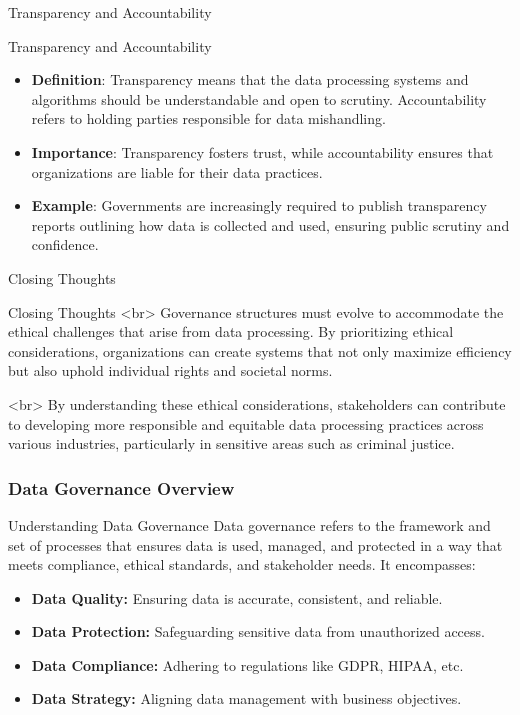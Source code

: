 \documentclass[aspectratio=169]{beamer}
\begin{document}
\begin{frame}[fragile]{Transparency and Accountability}
  \begin{block}{Transparency and Accountability}
    \begin{itemize}
      \item \textbf{Definition}: Transparency means that the data processing systems and algorithms should be understandable and open to scrutiny. Accountability refers to holding parties responsible for data mishandling.
      \item \textbf{Importance}: Transparency fosters trust, while accountability ensures that organizations are liable for their data practices.
      \item \textbf{Example}: Governments are increasingly required to publish transparency reports outlining how data is collected and used, ensuring public scrutiny and confidence.
    \end{itemize}
  \end{block}
\end{frame}

\begin{frame}[fragile]{Closing Thoughts}
  \begin{block}{Closing Thoughts}
    <br>
    Governance structures must evolve to accommodate the ethical challenges that arise from data processing. By prioritizing ethical considerations, organizations can create systems that not only maximize efficiency but also uphold individual rights and societal norms.
    
    <br>
    By understanding these ethical considerations, stakeholders can contribute to developing more responsible and equitable data processing practices across various industries, particularly in sensitive areas such as criminal justice.
  \end{block}
\end{frame}

\begin{frame}[fragile]
    \frametitle{Data Governance Overview}
    \begin{block}{Understanding Data Governance}
        Data governance refers to the framework and set of processes that ensures data is used, managed, and protected in a way that meets compliance, ethical standards, and stakeholder needs. It encompasses:
    \end{block}
    \begin{itemize}
        \item \textbf{Data Quality:} Ensuring data is accurate, consistent, and reliable.
        \item \textbf{Data Protection:} Safeguarding sensitive data from unauthorized access.
        \item \textbf{Data Compliance:} Adhering to regulations like GDPR, HIPAA, etc.
        \item \textbf{Data Strategy:} Aligning data management with business objectives.
    \end{itemize}
\end{frame}
\end{document}
